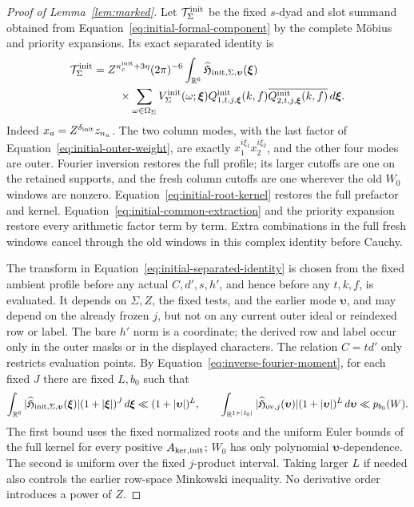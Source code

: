 \documentclass[11pt,a4paper]{article}
\numberwithin{equation}{section}
\numberwithin{figure}{section}
\theoremstyle{definition}
\theoremstyle{remark}
\begin{document}
\begin{proof}[Proof of Lemma~\ref{lem:marked}]
Let \(\mathcal T_\Sigma^{\rm init}\) be the fixed \(s\)-dyad and
slot summand obtained from Equation~\eqref{eq:initial-formal-component}
by the complete M\"obius and priority expansions.  Its exact separated
identity is
\begin{equation}\label{eq:initial-separated-identity}
 \begin{split}
 \mathcal T_\Sigma^{\rm init}={}&
 Z^{\kappa_c^{\rm init}+3\eta}(2\pi)^{-6}
 \int_{\mathbb R^6}
 \widehat{\mathfrak H}_{{\rm init},\Sigma,\boldsymbol\upsilon}
       (\boldsymbol\xi)\\
 &\quad\times\sum_{\omega\in\Omega_\Sigma}
 V_\Sigma^{\rm init}(\omega;\boldsymbol\xi)
 Q^{\rm init}_{1,t,j,\boldsymbol\xi}(k,f)
 \overline{Q^{\rm init}_{2,t,j,\boldsymbol\xi}(k,f)}
 \,d\boldsymbol\xi.
 \end{split}
\end{equation}
Indeed \(x_a=Z^{\delta_{\rm init}}z_{n_a}\).  The two column modes,
with the last factor of Equation~\eqref{eq:initial-outer-weight},
are exactly \(x_1^{i\xi_1}x_2^{i\xi_2}\), and the other four modes
are outer.  Fourier inversion restores the full profile; its larger
cutoffs are one on the retained supports, and the fresh column
cutoffs are one wherever the old \(W_0\) windows are nonzero.
Equation~\eqref{eq:initial-root-kernel} restores the full prefactor
and kernel.  Equation~\eqref{eq:initial-common-extraction} and the
priority expansion restore every arithmetic factor term by term.
Extra combinations in the full fresh windows cancel through the old
windows in this complex identity before Cauchy.

The transform in Equation~\eqref{eq:initial-separated-identity}
is chosen from the fixed ambient profile before any actual
\(C,d',s,h'\), and hence before any \(t,k,f\), is evaluated.  It
depends on \(\Sigma,Z\), the fixed tests, and the earlier mode
\(\boldsymbol\upsilon\), and may depend on the already frozen \(j\),
but not on any current outer ideal or reindexed row or label.  The bare
\(h'\) norm is a coordinate; the derived row and label occur only
in the outer masks or in the displayed characters.  The relation
\(C=td'\) only restricts evaluation points.  By
Equation~\eqref{eq:inverse-fourier-moment}, for each fixed \(J\)
there are fixed \(L,b_0\) such that
\[
 \int_{\mathbb R^6}
 |\widehat{\mathfrak H}_{{\rm init},\Sigma,\boldsymbol\upsilon}
       (\boldsymbol\xi)|(1+|\boldsymbol\xi|)^J\,d\boldsymbol\xi
 \ll (1+|\boldsymbol\upsilon|)^L,\qquad
 \int_{\mathbb R^{1+|I_0|}}|\widehat{\mathfrak H}_{{\rm ov},j}(\boldsymbol\upsilon)|
       (1+|\boldsymbol\upsilon|)^L\,d\boldsymbol\upsilon
 \ll p_{b_0}(W).
\]
The first bound uses the fixed normalized roots and the uniform Euler
bounds of the full kernel for every positive
\(A_{{\rm ker},{\rm init}}\); \(W_0\) has only polynomial
\(\boldsymbol\upsilon\)-dependence.  The second is uniform over the
fixed \(j\)-product interval.  Taking larger \(L\) if needed also
controls the earlier row-space Minkowski inequality.  No derivative
order introduces a power of \(Z\).


\end{proof}
\end{document}
